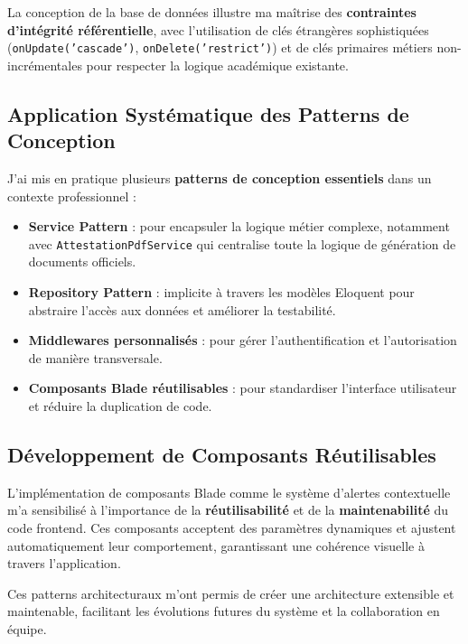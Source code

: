 \documentclass[12pt,a4paper]{report}
\begin{document}
La conception de la base de données illustre ma maîtrise des \textbf{contraintes d'intégrité référentielle}, avec l'utilisation de clés étrangères sophistiquées (\texttt{onUpdate('cascade')}, \texttt{onDelete('restrict')}) et de clés primaires métiers non-incrémentales pour respecter la logique académique existante.

\subsection{Application Systématique des Patterns de Conception}

J'ai mis en pratique plusieurs \textbf{patterns de conception essentiels} dans un contexte professionnel :

\begin{itemize}
    \item \textbf{Service Pattern} : pour encapsuler la logique métier complexe, notamment avec \texttt{AttestationPdfService} qui centralise toute la logique de génération de documents officiels.
    
    \item \textbf{Repository Pattern} : implicite à travers les modèles Eloquent pour abstraire l'accès aux données et améliorer la testabilité.
    
    \item \textbf{Middlewares personnalisés} : pour gérer l'authentification et l'autorisation de manière transversale.
    
    \item \textbf{Composants Blade réutilisables} : pour standardiser l'interface utilisateur et réduire la duplication de code.
\end{itemize}

\subsection{Développement de Composants Réutilisables}

L'implémentation de composants Blade comme le système d'alertes contextuelle m'a sensibilisé à l'importance de la \textbf{réutilisabilité} et de la \textbf{maintenabilité} du code frontend. Ces composants acceptent des paramètres dynamiques et ajustent automatiquement leur comportement, garantissant une cohérence visuelle à travers l'application.

Ces patterns architecturaux m'ont permis de créer une architecture extensible et maintenable, facilitant les évolutions futures du système et la collaboration en équipe.
\end{document}
